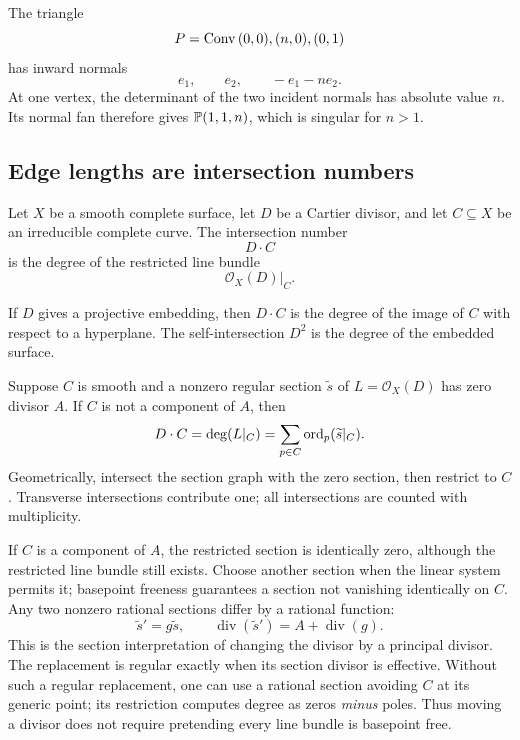 \begin{example}
The triangle
\[
P=\operatorname{Conv}{(0,0),(n,0),(0,1)}
\]
has inward normals
\[
e_1,
\qquad
e_2,
\qquad
-e_1-ne_2.
\]
At one vertex, the determinant of the two incident normals has
absolute value \(n\). Its normal fan therefore gives
\(\mathbb{P}(1,1,n)\), which is singular for \(n>1\).
\end{example}

\subsection{Edge lengths are intersection numbers}

\begin{agcheatsheet}
Let \(X\) be a smooth complete surface, let \(D\) be a Cartier
divisor, and let \(C\subseteq X\) be an irreducible complete curve.
The intersection number
\[
D\cdot C
\]
is the degree of the restricted line bundle
\[
\mathcal O_X(D)|_C.
\]

If \(D\) gives a projective embedding, then \(D\cdot C\) is the degree
of the image of \(C\) with respect to a hyperplane. The
self-intersection \(D^2\) is the degree of the embedded surface.
\end{agcheatsheet}

\begin{observation}
\label{obs:classroom-oct19-restrict-section}
Suppose \(C\) is smooth and a nonzero regular section
\(\widetilde s\) of \(L=\mathcal O_X(D)\) has zero divisor \(A\).
If \(C\) is not a component of \(A\), then
\[
D\cdot C=\deg(L|_C)
=\sum_{p\in C}\operatorname{ord}_p(\widetilde s|_C).
\]
Geometrically, intersect the section graph with the zero section,
then restrict to \(C\). Transverse intersections contribute one;
all intersections are counted with multiplicity.

If \(C\) is a component of \(A\), the restricted section is
identically zero, although the restricted line bundle still exists.
Choose another section when the linear system permits it; basepoint
freeness guarantees a section not vanishing identically on \(C\).
Any two nonzero rational sections differ by a rational function:
\[
\widetilde s'=g\widetilde s,\qquad
\operatorname{div}(\widetilde s')
=A+\operatorname{div}(g).
\]
This is the section interpretation of changing the divisor by a
principal divisor. The replacement is regular exactly when its
section divisor is effective. Without such a regular replacement,
one can use a rational section avoiding \(C\) at its generic point;
its restriction computes degree as zeros \emph{minus} poles. Thus
moving a divisor does not require pretending every line bundle is
basepoint free.
\end{observation}

